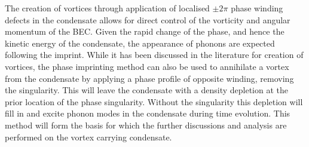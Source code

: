 The creation of vortices through application of localised $\pm 2\pi$ phase winding defects in the condensate allows for direct control of the vorticity and angular momentum of the BEC. Given the rapid change of the phase, and hence the kinetic energy of the condensate, the appearance of phonons are expected following the imprint. While it has been discussed in the literature for creation of vortices, the phase imprinting method can also be used to annihilate a vortex from the condensate by applying a phase profile of opposite winding, removing the singularity. This will leave the condensate with a density depletion at the prior location of the phase singularity. Without the singularity this depletion will fill in and excite phonon modes in the condensate during time evolution. This method will form the basis for which the further discussions and analysis are performed on the vortex carrying condensate.

